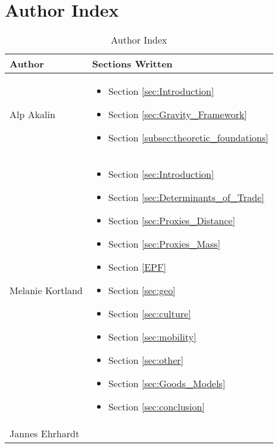\section{Author Index}


\vspace{2cm}








\begin{table}[h]
\centering
\caption{Author Index}
\label{tab:author_index}
\begin{tabular}{|p{3cm}|p{5cm}|}
\hline
\textbf{Author} & \textbf{Sections Written} \\
\hline
\vspace{1mm} Alp Akalin \vspace{1mm} & \vspace{1mm} \begin{itemize}
    \item Section \ref{sec:Introduction} 
    \item Section \ref{sec:Gravity_Framework}
    \item Section \ref{subsec:theoretic_foundations}
\end{itemize} \\
\hline
\vspace{1mm} Melanie Kortland \vspace{1mm} & \vspace{1mm} \begin{itemize}
    \item Section \ref{sec:Introduction} 
    \item Section \ref{sec:Determinants_of_Trade}
    \item Section \ref{sec:Proxies_Distance}
    \item Section \ref{sec:Proxies_Mass}
    \item Section \ref{EPF}
    \item Section \ref{sec:geo}
    \item Section \ref{sec:culture}
    \item Section \ref{sec:mobility}
    \item Section \ref{sec:other}
    \item Section \ref{sec:Goods_Models}
    \item Section \ref{sec:conclusion}
\end{itemize} \\
\hline
\vspace{1mm} Jannes Ehrhardt \vspace{1mm} & \vspace{1mm} \begin{itemize}

\end{itemize}
\end{tabular}
\end{table}

